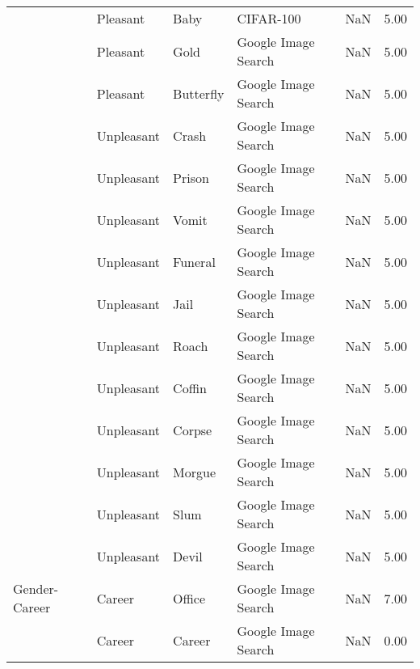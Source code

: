 \begin{tabular}{lllllr}
     & Pleasant &               Baby &            CIFAR-100 &                                                NaN &  5.00 \\
     & Pleasant &               Gold &  Google Image Search &                                                NaN &  5.00 \\
     & Pleasant &          Butterfly &  Google Image Search &                                                NaN &  5.00 \\
     & Unpleasant &              Crash &  Google Image Search &                                                NaN &  5.00 \\
     & Unpleasant &             Prison &  Google Image Search &                                                NaN &  5.00 \\
     & Unpleasant &              Vomit &  Google Image Search &                                                NaN &  5.00 \\
     & Unpleasant &            Funeral &  Google Image Search &                                                NaN &  5.00 \\
     & Unpleasant &               Jail &  Google Image Search &                                                NaN &  5.00 \\
     & Unpleasant &              Roach &  Google Image Search &                                                NaN &  5.00 \\
     & Unpleasant &             Coffin &  Google Image Search &                                                NaN &  5.00 \\
     & Unpleasant &             Corpse &  Google Image Search &                                                NaN &  5.00 \\
     & Unpleasant &             Morgue &  Google Image Search &                                                NaN &  5.00 \\
     & Unpleasant &               Slum &  Google Image Search &                                                NaN &  5.00 \\
     & Unpleasant &              Devil &  Google Image Search &                                                NaN &  5.00 \\
Gender-Career & Career &             Office &  Google Image Search &                                                NaN &  7.00 \\
     & Career &             Career &  Google Image Search &                                                NaN &  0.00 \\

\end{tabular}
